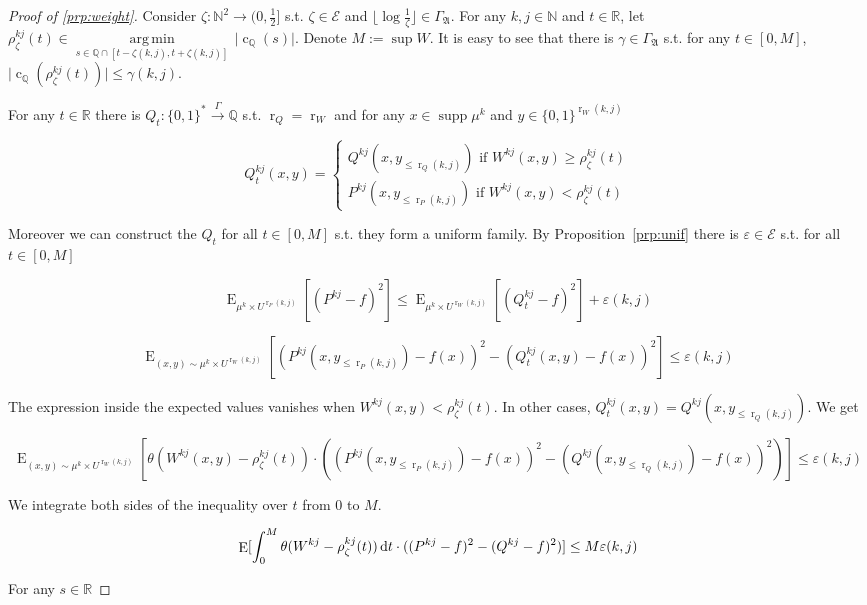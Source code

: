\documentclass{article}
\theoremstyle{definition}
\theoremstyle{plain}
\newcommand{\Words}{{\{ 0, 1 \}^*}}
\newcommand{\WordsLen}[1]{{\{ 0, 1 \}^{#1}}}
\DeclareMathOperator{\Supp}{supp}
\DeclareMathOperator{\E}{E}
\DeclareMathOperator{\R}{r}
\DeclareMathOperator{\En}{c}
\newcommand{\Argmin}[1]{\underset{#1}{\operatorname{arg\,min}}\,}
\newcommand{\Nats}{\mathbb{N}}
\newcommand{\Rats}{\mathbb{Q}}
\newcommand{\Reals}{\mathbb{R}}
\newcommand{\Abs}[1]{\lvert #1 \rvert}
\newcommand{\Floor}[1]{\lfloor #1 \rfloor}
\begin{document}
\begin{proof}[Proof of \ref{prp:weight}]

Consider $\zeta: \Nats^2 \rightarrow (0,\frac{1}{2}]$ s.t.  $\zeta \in \mathcal{E}$ and $\Floor{\log \frac{1}{\zeta}} \in \Gamma_{\mathfrak{A}}$. For any $k,j \in \Nats$ and $t \in \Reals$, let $\rho_\zeta^{kj}(t) \in \Argmin{s \in \Rats \cap [t-\zeta(k,j),t+\zeta(k,j)]} \Abs{\En_\Rats(s)}$. Denote $M:= \sup W$. It is easy to see that there is $\gamma \in \Gamma_{\mathfrak{A}}$ s.t. for any $t \in [0, M]$, ${\Abs{\En_\Rats(\rho_\zeta^{kj}(t))} \leq \gamma(k,j)}$.

For any $t \in \Reals$ there is $Q_t: \Words \xrightarrow{\Gamma} \Rats$ s.t. $\R_Q=\R_W$ and for any $x \in \Supp \mu^k$ and ${y \in \WordsLen{\R_W(k,j)}}$

$$Q_t^{kj}(x,y)=\begin{cases}Q^{kj}(x,y_{\leq \R_Q(k,j)}) \text{ if } W^{kj}(x,y) \geq \rho^{kj}_\zeta(t) \\ P^{kj}(x,y_{\leq \R_P(k,j)}) \text{ if } W^{kj}(x,y) < \rho^{kj}_\zeta(t)\end{cases}$$

Moreover we can construct the $Q_t$ for all $t \in [0, M]$ s.t. they form a uniform family. By Proposition~\ref{prp:unif} there is $\varepsilon \in \mathcal{E}$ s.t. for all $t \in [0, M]$

$$\E_{\mu^k \times U^{\R_P(k,j)}}[(P^{kj}-f)^2] \leq \E_{\mu^k \times U^{\R_W(k,j)}}[(Q_t^{kj}-f)^2] + \varepsilon(k,j)$$

$$\E_{(x,y) \sim \mu^k \times U^{\R_W(k,j)}}[(P^{kj}(x,y_{\leq \R_P(k,j)})-f(x))^2-(Q_t^{kj}(x,y)-f(x))^2] \leq \varepsilon(k,j)$$

The expression inside the expected values vanishes when $W^{kj}(x,y) < \rho^{kj}_\zeta(t)$. In other cases, $Q_t^{kj}(x,y) = Q^{kj}(x,y_{\leq \R_Q(k,j)})$. We get

$$\E_{(x,y) \sim \mu^k \times U^{\R_W(k,j)}}[\theta(W^{kj}(x,y)-\rho_\zeta^{kj}(t)) \cdot ((P^{kj}(x,y_{\leq \R_P(k,j)})-f(x))^2-(Q^{kj}(x,y_{\leq \R_Q(k,j)})-f(x))^2)] \leq \varepsilon(k,j)$$

We integrate both sides of the inequality over $t$ from 0 to $M$.

\begin{equation}
\label{eqn:prp__weight__prf1}
\E[\int_0^M\theta(W^{kj}-\rho_\zeta^{kj}(t)) \dif t \cdot ((P^{kj}-f)^2-(Q^{kj}-f)^2)] \leq M \varepsilon(k,j)
\end{equation}

For any $s \in \Reals$


\end{proof}
\end{document}
